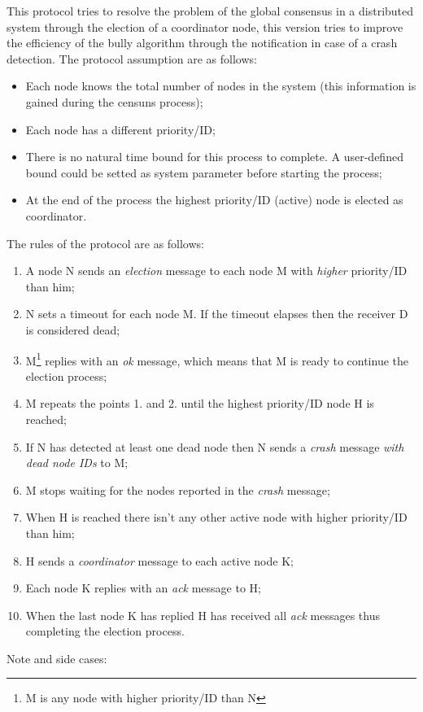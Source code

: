 This protocol tries to resolve the problem of the global consensus in a distributed system through the election
of a coordinator node, this version tries to improve the efficiency of the bully algorithm through the notification in case of a crash detection. The protocol assumption are as follows:
\begin{itemize}
  \item Each node knows the total number of nodes in the system (this information is gained during the censuns process);
  \item Each node has a different priority/ID;
  \item There is no natural time bound for this process to complete. A user-defined bound could be setted as system parameter before starting the process;
  \item At the end of the process the highest priority/ID (active) node is elected as coordinator.
\end{itemize}
The rules of the protocol are as follows:
\begin{enumerate}
  \item A node N sends an \textit{election} message to each node M with \textit{higher} priority/ID than him;
  \item N sets a timeout for each node M. If the timeout elapses then the receiver D is considered dead;
  \item M\footnote{M is any node with higher priority/ID than N} replies with an \textit{ok} message, which means that M is ready to continue the election process;
  \item M repeats the points 1. and 2. until the highest priority/ID node H is reached;
  \item If N has detected at least one dead node then N sends a \textit{crash} message \textit{with dead node IDs} to M;
  \item M stops waiting for the nodes reported in the \textit{crash} message;
  \item When H is reached there isn't any other active node with higher priority/ID than him;
  \item H sends a \textit{coordinator} message to each active node K;
  \item Each node K replies with an \textit{ack} message to H;
  \item When the last node K has replied H has received all \textit{ack} messages thus completing the election process.
\end{enumerate}
Note and side cases:
